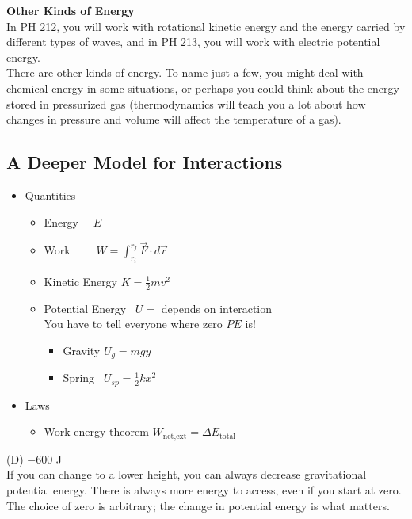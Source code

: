 \documentclass[]{article}
\begin{document}
\newpage
\begin{TeacherMargin}
\noindent\textbf{Other Kinds of Energy} \\
In PH 212, you will work with rotational kinetic energy and the energy carried by different types of waves, and in PH 213, you will work with electric potential energy. \\

\noindent There are other kinds of energy. To name just a few, you might deal with chemical energy in some situations, or perhaps you could think about the energy stored in pressurized gas (thermodynamics will teach you a lot about how changes in pressure and volume will affect the temperature of a gas).
\end{TeacherMargin}
\begin{PresentSpace}
\vspace{-10pt}
\section*{A Deeper Model for Interactions}
\vspace{-10pt}
\begin{itemize}
	\item Quantities
	\begin{itemize}
		\item Energy \qquad \qquad \qquad \quad \ \ $E$
		\item Work \qquad \qquad \qquad \quad \ \ \ \ $W = \int_{r_{i}}^{r_{f}}\vec{F}\cdot d\vec{r}$
		\item Kinetic Energy \qquad \qquad $K=\frac{1}{2}mv^{2}$
		\item Potential Energy \qquad \quad \ $U=$ depends on interaction \\
		You have to tell everyone where zero $PE$ is!
		\begin{itemize}
			\item Gravity \qquad $U_{g} = mgy$
			\item Spring \qquad \ $U_{sp} = \frac{1}{2}kx^{2}$
		\end{itemize}
	\end{itemize}
	\item Laws
	\begin{itemize}
		\item Work-energy theorem \quad $W_{\text{net,ext}} = \Delta E_{\text{total}}$
	\end{itemize}
\end{itemize}
\end{PresentSpace}
\newpage
\begin{TeacherMargin}
\noindent (D) $-$600 J \\
If you can change to a lower height, you can always decrease gravitational potential energy. There is always more energy to access, even if you start at zero. The choice of zero is arbitrary; the change in potential energy is what matters.
\end{TeacherMargin}
\end{document}
